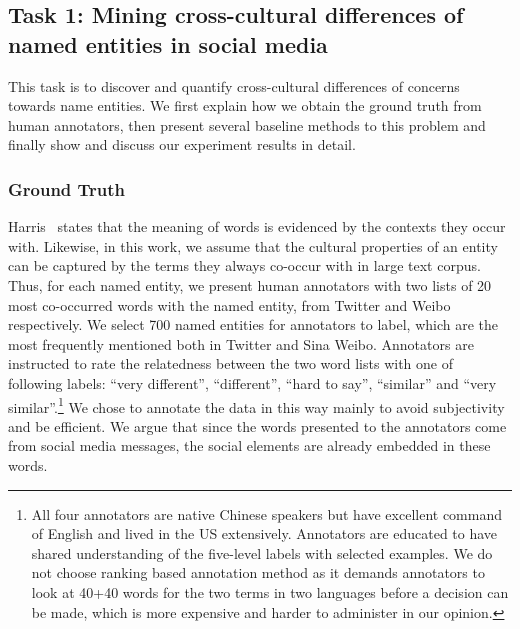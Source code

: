 \subsection{Task 1: Mining cross-cultural differences of named entities in social media}
\label{sec:mcdne}
This task is to discover and quantify cross-cultural differences of concerns towards name entities. 
We first explain how we obtain the ground truth from human annotators, then present several baseline methods to this problem and finally 
show and discuss our experiment results in detail.

\subsubsection{Ground Truth}
\label{sec:mcdne_truth}
Harris~ states that the meaning of 
words is evidenced by the contexts they occur with. 
Likewise, in this work, we assume that the cultural properties of an entity 
can be captured by the terms they always co-occur with in large text corpus. 
Thus, for each named entity, we present human annotators with two lists of 20 most co-occurred words with 
the named entity, from Twitter and Weibo respectively. 
We select 700 named entities for annotators to label, which
are the most frequently mentioned both in Twitter and Sina Weibo. 
Annotators are instructed to rate the relatedness between the 
two word lists with one of following labels: ``very different'', 
``different'', ``hard to say'',  ``similar'' and 
``very similar''.\footnote{All four annotators are native Chinese speakers 
but have excellent command of English and lived in the US extensively. 
Annotators are educated to have shared understanding of the five-level 
labels with selected examples. We do not choose ranking based annotation method as it demands annotators to look 
at 40+40 words for the two terms in two languages before a decision can
be made, which is more expensive and harder to administer in our opinion.}
We chose to annotate the data in this way mainly to avoid
subjectivity and be efficient. 
We argue that since the words presented to the annotators come from 
social media messages, the social elements are already embedded in 
these words.

